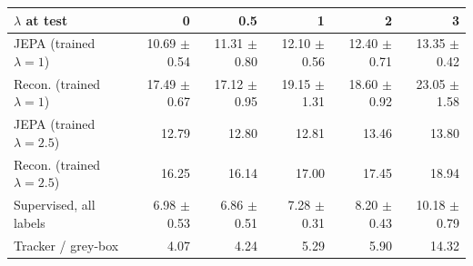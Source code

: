 \begin{tabular}{lrrrrr}
\toprule
$\lambda$ at test & 0 & 0.5 & 1 & 2 & 3\\
\midrule
JEPA (trained $\lambda=1$) & 10.69 $\pm$ 0.54 & 11.31 $\pm$ 0.80 & 12.10 $\pm$ 0.56 & 12.40 $\pm$ 0.71 & 13.35 $\pm$ 0.42\\
Recon. (trained $\lambda=1$) & 17.49 $\pm$ 0.67 & 17.12 $\pm$ 0.95 & 19.15 $\pm$ 1.31 & 18.60 $\pm$ 0.92 & 23.05 $\pm$ 1.58\\
JEPA (trained $\lambda=2.5$) & 12.79 & 12.80 & 12.81 & 13.46 & 13.80\\
Recon. (trained $\lambda=2.5$) & 16.25 & 16.14 & 17.00 & 17.45 & 18.94\\
Supervised, all labels & 6.98 $\pm$ 0.53 & 6.86 $\pm$ 0.51 & 7.28 $\pm$ 0.31 & 8.20 $\pm$ 0.43 & 10.18 $\pm$ 0.79\\
Tracker / grey-box & 4.07 & 4.24 & 5.29 & 5.90 & 14.32\\
\bottomrule
\end{tabular}